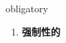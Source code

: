 
\begin{frame}
{\huge obligatory}
\begin{center}
\begin{enumerate}\Large
  \item \textbf{强制性的}
\end{enumerate}
\end{center}
\end{frame}
